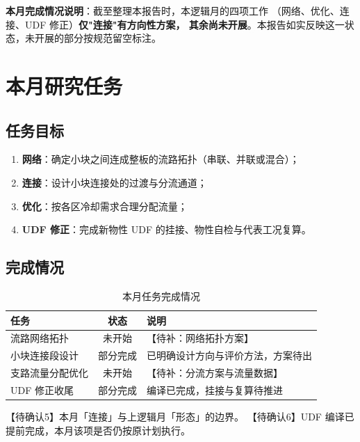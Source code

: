 \documentclass[stage2,fontset=fandol]{ydzjreport}
\begin{document}
\makestagetwohead

\begin{notebox}
\textbf{本月完成情况说明}：截至整理本报告时，本逻辑月的四项工作
（网络、优化、连接、UDF 修正）\textbf{仅"连接"有方向性方案，
其余尚未开展}。本报告如实反映这一状态，未开展的部分按规范留空标注。
\end{notebox}

\section{本月研究任务}

\subsection{任务目标}

\begin{enumerate}
  \item \textbf{网络}：确定小块之间连成整板的流路拓扑（串联、并联或混合）；
  \item \textbf{连接}：设计小块连接处的过渡与分流通道；
  \item \textbf{优化}：按各区冷却需求合理分配流量；
  \item \textbf{UDF 修正}：完成新物性 UDF 的挂接、物性自检与代表工况复算。
\end{enumerate}

\subsection{完成情况}

\begin{table}[H]
\centering
\caption{本月任务完成情况}
\label{tab:tasks}
\begin{tabularx}{\textwidth}{@{}Y c Y@{}}
\toprule
{} 任务 & 状态 & 说明 \\
\midrule
流路网络拓扑 & 未开始 & 【待补：网络拓扑方案】 \\
小块连接段设计 & 部分完成 & 已明确设计方向与评价方法，方案待出 \\
支路流量分配优化 & 未开始 & 【待补：分流方案与流量数据】 \\
UDF 修正收尾 & 部分完成 & 编译已完成，挂接与复算待推进 \\
\bottomrule
\end{tabularx}
\end{table}

【待确认5】本月「连接」与上逻辑月「形态」的边界。
【待确认6】UDF 编译已提前完成，本月该项是否仍按原计划执行。
\end{document}
